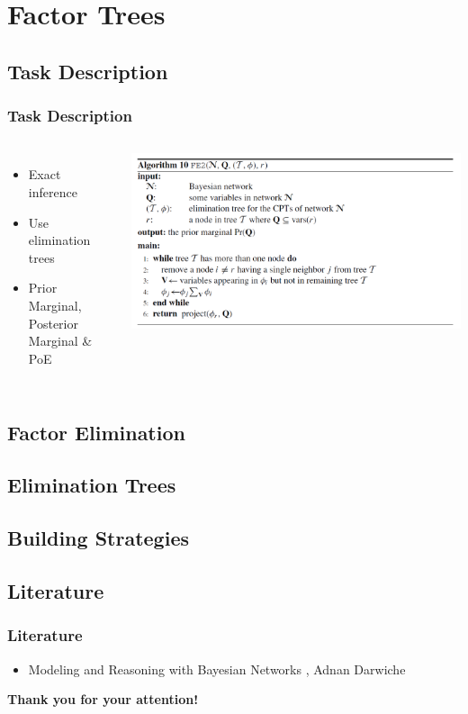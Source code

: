 \section{Factor Trees}

\subsection{Task Description}


\begin{frame}
\frametitle{Task Description}
\begin{columns}
\begin{itemize}
\item Exact inference
\item Use elimination trees
\item Prior Marginal, Posterior Marginal \& PoE
\end{itemize}
\includegraphics[width=.8\textwidth]{figures/algo10}
\end{columns}
\end{frame}




\subsection{Factor Elimination}



\subsection{Elimination Trees}

\subsection{Building Strategies}


\subsection{Literature}

\begin{frame}
\frametitle{Literature}
\begin{itemize}
\item Modeling and Reasoning with Bayesian Networks , Adnan Darwiche 
\end{itemize}
\end{frame}

\begin{frame}
\textbf{Thank you for your attention!}
\end{frame}

